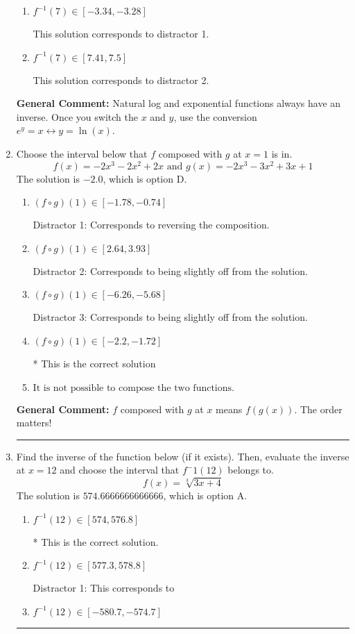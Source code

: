 \documentclass{extbook}[14pt]
\newcommand{\litem}[1]{\item #1

\rule{\textwidth}{0.4pt}}
\begin{document}
\begin{enumerate}
{\begin{enumerate}[label=\Alph*.]
 This solution corresponds to distractor 3.
\item \( f^{-1}(7) \in [-3.34, -3.28] \)

 This solution corresponds to distractor 1.
\item \( f^{-1}(7) \in [7.41, 7.5] \)

 This solution corresponds to distractor 2.
\end{enumerate}

\textbf{General Comment:} Natural log and exponential functions always have an inverse. Once you switch the $x$ and $y$, use the conversion $ e^y = x \leftrightarrow y=\ln(x)$.
}
\litem{
Choose the interval below that $f$ composed with $g$ at $x=1$ is in.
\[ f(x) = -2x^{3} -2 x^{2} +2 x \text{ and } g(x) = -2x^{3} -3 x^{2} +3 x + 1 \]The solution is \( -2.0 \), which is option D.\begin{enumerate}[label=\Alph*.]
\item \( (f \circ g)(1) \in [-1.78, -0.74] \)

 Distractor 1: Corresponds to reversing the composition.
\item \( (f \circ g)(1) \in [2.64, 3.93] \)

 Distractor 2: Corresponds to being slightly off from the solution.
\item \( (f \circ g)(1) \in [-6.26, -5.68] \)

 Distractor 3: Corresponds to being slightly off from the solution.
\item \( (f \circ g)(1) \in [-2.2, -1.72] \)

* This is the correct solution
\item \( \text{It is not possible to compose the two functions.} \)


\end{enumerate}

\textbf{General Comment:} $f$ composed with $g$ at $x$ means $f(g(x))$. The order matters!
}
\litem{
Find the inverse of the function below (if it exists). Then, evaluate the inverse at $x = 12$ and choose the interval that $f^-1(12)$ belongs to.
\[ f(x) = \sqrt[3]{3 x + 4} \]The solution is \( 574.6666666666666 \), which is option A.\begin{enumerate}[label=\Alph*.]
\item \( f^{-1}(12) \in [574, 576.8] \)

* This is the correct solution.
\item \( f^{-1}(12) \in [577.3, 578.8] \)

 Distractor 1: This corresponds to 
\item \( f^{-1}(12) \in [-580.7, -574.7] \)


\end{enumerate}}
\end{enumerate}
\end{document}
